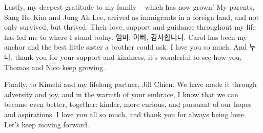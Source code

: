 Lastly, my deepest gratitude to my family -- which has now grown! My parents, Sang Ho Kim and Jung Ah Lee, arrived as immigrants in a foreign land, and not only survived, but thrived. Their love, support and guidance throughout my life has led me to where I stand today. 엄마, 아빠, 감사합니다. Carol has been my anchor and the best little sister a brother could ask. I love you so much. And 누나, thank you for your support and kindness, it's wonderful to see how you, Thomas and Nico keep growing.

Finally, to Kimchi and my lifelong partner, Jill Chien. We have made it through adversity and joy, and in the warmth of your embrace, I know that we can become even better, together: kinder, more curious, and pursuant of our hopes and aspirations. I love you all so much, and thank you for always being here. Let's keep moving forward.
